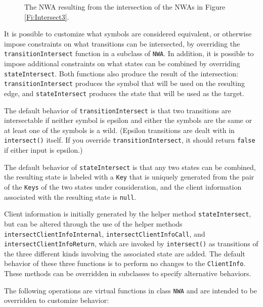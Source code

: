 \begin{figure}[p]
  \centering
  \caption{The NWA resulting from the intersection of the NWAs in Figure \ref{Fi:Intersect3}.}
  \label{Fi:Intersect4}
\end{figure}

\antistupidfloats

It is possible to customize what symbols are considered equivalent, or
otherwise impose constraints on what transitions can be intersected, by
overriding the \texttt{transitionIntersect} function in a subclass of
\texttt{NWA}. In addition, it is possible to impose additional constraints on
what states can be combined by overriding \texttt{stateIntersect}. Both
functions also produce the result of the intersection:
\texttt{transitionIntersect} produces the symbol that will be used on the
resulting edge, and \texttt{stateIntersect} produces the state that will be
used as the target.

The default behavior of
\texttt{transitionIntersect} is that two transitions are intersectable if
neither symbol is epsilon and either the symbols are the same or at least one of
the symbols is a wild. (Epsilon transitions are dealt with in
\texttt{intersect()} itself. If you override \texttt{transitionIntersect}, it
should return \texttt{false} if either input is epsilon.)

The default behavior of \texttt{stateIntersect} is that any two
states can be combined, the resulting state is labeled with a
\texttt{Key} that is uniquely generated from the pair of the \texttt{Keys} of
the two states under consideration, and the client information associated
with the resulting state is \texttt{null}.


Client information is initially generated by the helper method \texttt{stateIntersect},
but can be altered through the use of the helper methods
\texttt{intersectClientInfoInternal}, \texttt{intersectClientInfoCall}, and
\texttt{intersect\-Client\-InfoReturn}, which are invoked by
\texttt{intersect()} as transitions of the three different kinds involving the
associated state are added.  The default behavior of these three functions is
to perform no changes to the \texttt{ClientInfo}.  These methods can be
overridden in subclasses to specify alternative behaviors.

\goodbreak
The following operations are virtual functions in class \texttt{NWA} and are intended
to be overridden to customize behavior:

